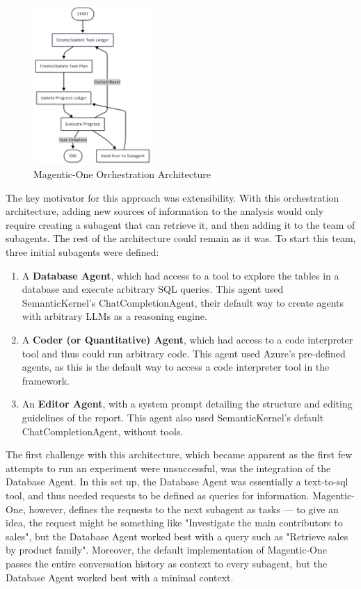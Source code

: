 \documentclass[a4paper]{report}
\begin{document}
\begin{figure}[h]
\centering
\includegraphics[width=0.4\textwidth]{images/mangentic-one-simplified.png}
\caption{Magentic-One Orchestration Architecture}
\label{fig:magentic-one-architecture}
\end{figure}

The key motivator for this approach was extensibility. With this orchestration architecture, adding new sources of information to the analysis would only require creating a subagent that can retrieve it, and then adding it to the team of subagents. The rest of the architecture could remain as it was. To start this team, three initial subagents were defined:

\begin{enumerate}
    \item A \textbf{Database Agent}, which had access to a tool to explore the tables in a database and execute arbitrary SQL queries. This agent used SemanticKernel's ChatCompletionAgent, their default way to create agents with arbitrary LLMs as a reasoning engine.
    \item A \textbf{Coder (or Quantitative) Agent}, which had access to a code interpreter tool and thus could run arbitrary code. This agent used Azure's pre-defined agents, as this is the default way to access a code interpreter tool in the framework.
    \item An \textbf{Editor Agent}, with a system prompt detailing the structure and editing guidelines of the report. This agent also used SemanticKernel's default ChatCompletionAgent, without tools.
\end{enumerate}

The first challenge with this architecture, which became apparent as the first few attempts to run an experiment were unsuccessful, was the integration of the Database Agent. In this set up, the Database Agent was essentially a text-to-sql tool, and thus needed requests to be defined as queries for information. Magentic-One, however, defines the requests to the next subagent as tasks --- to give an idea, the request might be something like "Investigate the main contributors to sales", but the Database Agent worked best with a query such as "Retrieve sales by product family". Moreover, the default implementation of Magentic-One passes the entire conversation history as context to every subagent, but the Database Agent worked best with a minimal context.
\end{document}
